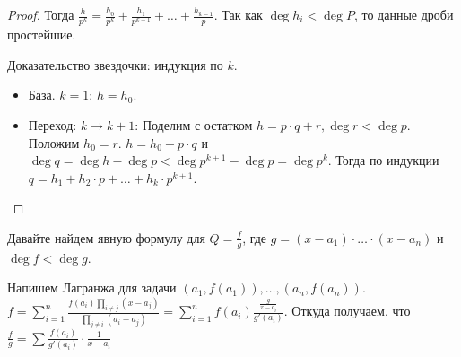 \begin{proof}
    Тогда $\frac{h}{p^k} = \frac{h_0}{p^k} + \frac{h_1}{p^{k-1}} + \ldots + \frac{h_{k-1}}{p}$. Так как $\deg h_i < \deg P$, то данные дроби простейшие.

    Доказательство звездочки: индукция по  $k$.
     \begin{itemize}
         \item База. $k=1$:  $h = h_0$.
         \item Переход: $k \to k + 1$: Поделим с остатком  $h = p \cdot q + r, \deg r < \deg p$. Положим  $h_0 = r$.  $h = h_0 + p \cdot q$ и  $\deg q = \deg h - \deg p < \deg p^{k+1} - \deg p = \deg p^k$. Тогда по индукции  $q = h_1 + h_2 \cdot p + \ldots + h_k \cdot p^{k+1}$.
    \end{itemize}
\end{proof}

Давайте найдем явную формулу для $Q = \frac{f}{g}$, где $g=(x-a_1)\cdot \ldots \cdot (x-a_n)$ и $\deg f  < \deg g$.

Напишем Лагранжа для задачи  $(a_1, f(a_1)), \ldots, (a_n, f(a_n))$. $f = \sum\limits_{i=1}^n \frac{f(a_i)\prod\limits_{i \neq j} (x-a_j)}{\prod\limits_{j \neq i} (a_i - a_j)} = \sum\limits_{i=1}^n f(a_i) \frac{\frac{g}{x-a_i}}{g'(a_i)}$. Откуда получаем, что $\frac{f}{g} = \sum \frac{f(a_i)}{g'(a_i)} \cdot \frac{1}{x-a_i}$
